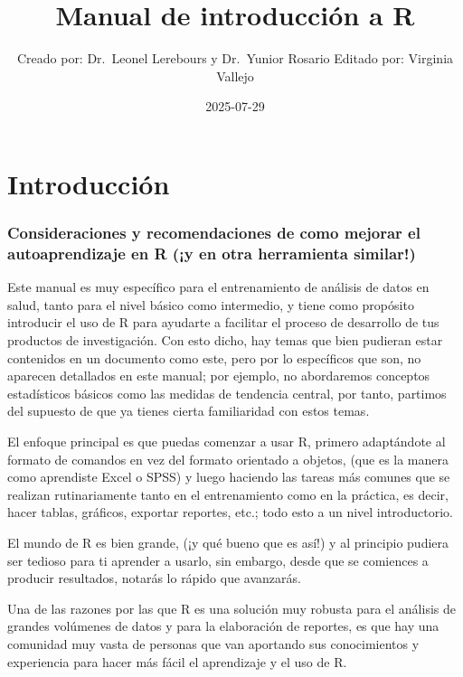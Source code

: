 \documentclass[
  letterpaper,
  DIV=11,
  numbers=noendperiod]{scrreprt}
\title{Manual de introducción a R}
\author{Creado por: Dr.~Leonel Lerebours y Dr.~Yunior Rosario Editado
por: Virginia Vallejo}
\date{2025-07-29}
\renewcommand*\contentsname{Contenido}
\newcommand\contentsname{Contenido}
\begin{document}
\maketitle

\renewcommand*\contentsname{Contenido}
{
\hypersetup{linkcolor=}
\setcounter{tocdepth}{2}
\tableofcontents
}


\chapter{Introducción}\label{introducciuxf3n}

\subsection{Consideraciones y recomendaciones de como mejorar el
autoaprendizaje en R (¡y en otra herramienta
similar!)}\label{consideraciones-y-recomendaciones-de-como-mejorar-el-autoaprendizaje-en-r-y-en-otra-herramienta-similar}

Este manual es muy específico para el entrenamiento de análisis de datos
en salud, tanto para el nivel básico como intermedio, y tiene como
propósito introducir el uso de R para ayudarte a facilitar el proceso de
desarrollo de tus productos de investigación. Con esto dicho, hay temas
que bien pudieran estar contenidos en un documento como este, pero por
lo específicos que son, no aparecen detallados en este manual; por
ejemplo, no abordaremos conceptos estadísticos básicos como las medidas
de tendencia central, por tanto, partimos del supuesto de que ya tienes
cierta familiaridad con estos temas.

El enfoque principal es que puedas comenzar a usar R, primero
adaptándote al formato de comandos en vez del formato orientado a
objetos, (que es la manera como aprendiste Excel o SPSS) y luego
haciendo las tareas más comunes que se realizan rutinariamente tanto en
el entrenamiento como en la práctica, es decir, hacer tablas, gráficos,
exportar reportes, etc.; todo esto a un nivel introductorio.

El mundo de R es bien grande, (¡y qué bueno que es así!) y al principio
pudiera ser tedioso para ti aprender a usarlo, sin embargo, desde que se
comiences a producir resultados, notarás lo rápido que avanzarás.

Una de las razones por las que R es una solución muy robusta para el
análisis de grandes volúmenes de datos y para la elaboración de
reportes, es que hay una comunidad muy vasta de personas que van
aportando sus conocimientos y experiencia para hacer más fácil el
aprendizaje y el uso de R.
\end{document}
